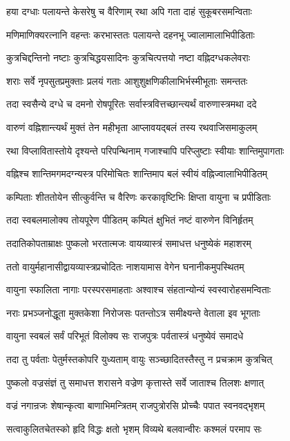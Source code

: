 \twolineshloka
{हया दग्धाः पलायन्ते केसरेषु च वैरिणाम्}
{रथा अपि गता दाहं सुकूबरसमन्विताः}%

\twolineshloka
{मणिमाणिक्यरत्नानि वहन्तः करभास्ततः}
{पलायन्ते दहनभू ज्वालामालाभिपीडिताः}%

\twolineshloka
{कुत्रचिद्दन्तिनो नष्टाः कुत्रचिद्धयसादिनः}
{कुत्रचित्पत्तयो नष्टा वह्निदग्धकलेवराः}%

\twolineshloka
{शराः सर्वे नृपसुतप्रमुक्ताः प्रलयं गताः}
{आशुशुक्षणिकीलाभिर्भस्मीभूताः समन्ततः}%

\twolineshloka
{तदा स्वसैन्ये दग्धे च दमनो रोषपूरितः}
{सर्वास्त्रवित्तच्छान्त्यर्थं वारुणास्त्रमथा ददे}%

\twolineshloka
{वारुणं वह्निशान्त्यर्थं मुक्तं तेन महीभृता}
{आप्लावयद्बलं तस्य रथवाजिसमाकुलम्}%

\twolineshloka
{रथा विप्लावितास्तोये दृश्यन्ते परिपन्थिनाम्}
{गजाश्चापि परिप्लुष्टाः स्वीयाः शान्तिमुपागताः}%

\twolineshloka
{वह्निश्च शान्तिमगमदग्न्यस्त्र परिमोचितः}
{शान्तिमाप बलं स्वीयं वह्निज्वालाभिपीडितम्}%

\twolineshloka
{कम्पिताः शीततोयेन सीत्कुर्वन्ति च वैरिणः}
{करकावृष्टिभिः क्षिप्ता वायुना च प्रपीडिताः}%

\twolineshloka
{तदा स्वबलमालोक्य तोयपूरेण पीडितम्}
{कम्पितं क्षुभितं नष्टं वारुणेन विनिर्हृतम्}%

\twolineshloka
{तदातिकोपताम्राक्षः पुष्कलो भरतात्मजः}
{वायव्यास्त्रं समाधत्त धनुष्येकं महाशरम्}%

\twolineshloka
{ततो वायुर्महानासीद्वायव्यास्त्रप्रचोदितः}
{नाशयामास वेगेन घनानीकमुपस्थितम्}%

\twolineshloka
{वायुना स्फालिता नागाः परस्परसमाहताः}
{अश्वाश्च संहतान्योन्यं स्वस्वारोहसमन्विताः}%

\twolineshloka
{नराः प्रभञ्जनोद्धूता मुक्तकेशा निरोजसः}
{पतन्तोऽत्र समीक्ष्यन्ते वेताला इव भूगताः}%

\twolineshloka
{वायुना स्वबलं सर्वं परिभूतं विलोक्य सः}
{राजपुत्रः पर्वतास्त्रं धनुष्येवं समादधे}%

\twolineshloka
{तदा तु पर्वताः पेतुर्मस्तकोपरि युध्यताम्}
{वायुः सञ्च्छादितस्तैस्तु न प्रचक्राम कुत्रचित्}%

\twolineshloka
{पुष्कलो वज्रसंज्ञं तु समाधत्त शरासने}
{वज्रेण कृत्तास्ते सर्वे जाताश्च तिलशः क्षणात्}%

\twolineshloka
{वज्रं नगान्रजः शेषान्कृत्वा बाणाभिमन्त्रितम्}
{राजपुत्रोरसि प्रोच्चैः पपात स्वनवद्भृशम्}%

\twolineshloka
{सत्वाकुलितचेतस्को हृदि विद्धः क्षतो भृशम्}
{विव्यथे बलवान्वीरः कश्मलं परमाप सः}%

